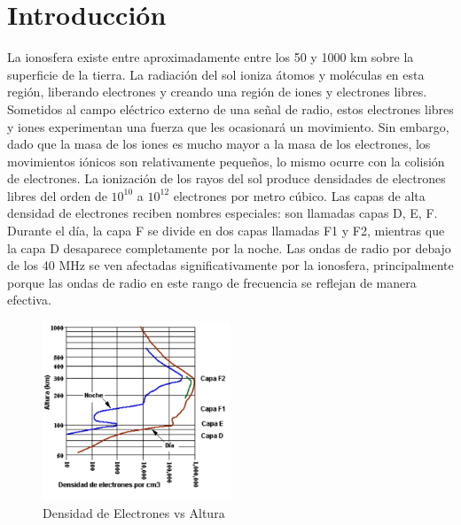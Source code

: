\documentclass[12pt]{article}
\author{Vale Fernando Alexis}
\begin{document}
\section{Introducción}
La ionosfera existe entre aproximadamente entre los 50 y 1000 km sobre la 
superficie de la tierra. La radiación del sol ioniza átomos y moléculas en 
esta región, liberando electrones y creando una región de iones y electrones 
libres. Sometidos al campo eléctrico externo de una señal de radio, estos 
electrones libres y iones experimentan una fuerza que les ocasionará un 
movimiento. Sin embargo, dado que la masa de los iones es mucho mayor a la masa 
de los electrones, los movimientos iónicos son relativamente pequeños, lo mismo 
ocurre con la colisión de electrones.
La ionización de los rayos del sol produce densidades de electrones libres del 
orden de $10^{10} $ a $10^{12}$ electrones por metro cúbico. Las capas de alta densidad 
de electrones reciben nombres especiales: son llamadas capas D, E, F.
Durante el día, la capa F se divide en dos capas llamadas F1 y F2, mientras que 
la capa D desaparece completamente por la noche. 
Las ondas de radio por debajo de los 40 MHz se ven afectadas significativamente 
por la ionosfera, principalmente porque las ondas de radio en este rango de 
frecuencia se reflejan de manera efectiva.

    \begin{figure}[ht]
    \centering
    \includegraphics[width=0.5\textwidth]{./Imagenes/DensidadElectrones.png}
    \caption{Densidad de Electrones vs Altura}
    \label{fig:first}
    \end{figure}
    \FloatBarrier
\end{document}

